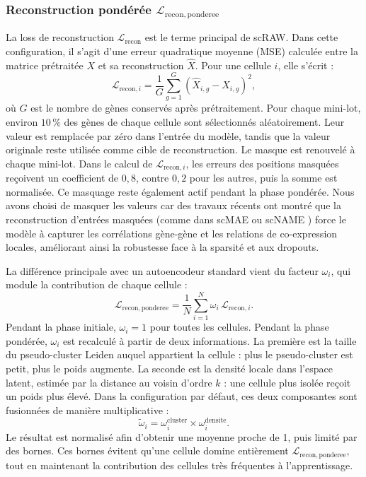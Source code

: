 \subsubsection*{\texorpdfstring{Reconstruction pondérée \(\mathcal{L}_{\mathrm{recon,ponderee}}\)}{Reconstruction pondérée L recon ponderee}}

La loss de reconstruction \(\mathcal{L}_{\mathrm{recon}}\) est le terme principal de scRAW. Dans cette configuration, il s'agit d'une erreur quadratique moyenne (MSE) calculée entre la matrice prétraitée \(X\) et sa reconstruction \(\hat{X}\). Pour une cellule \(i\), elle s'écrit :
\begin{equation}
  \mathcal{L}_{\mathrm{recon},i}
  =
  \frac{1}{G}\sum_{g=1}^{G}(\hat{X}_{i,g}-X_{i,g})^2,
  \label{eq:loss_recon_i}
\end{equation}
où \(G\) est le nombre de gènes conservés après prétraitement. Pour chaque mini-lot, environ \(10\,\%\) des gènes de chaque cellule sont sélectionnés aléatoirement. Leur valeur est remplacée par zéro dans l'entrée du modèle, tandis que la valeur originale reste utilisée comme cible de reconstruction. Le masque est renouvelé à chaque mini-lot. Dans le calcul de \(\mathcal{L}_{\mathrm{recon},i}\), les erreurs des positions masquées reçoivent un coefficient de \(0{,}8\), contre \(0{,}2\) pour les autres, puis la somme est normalisée. Ce masquage reste également actif pendant la phase pondérée. Nous avons choisi de masquer les valeurs car des travaux récents ont montré que la reconstruction d'entrées masquées (comme dans scMAE \cite{Fang2024scMAE} ou scNAME \cite{wan_scname_2022}) force le modèle à capturer les corrélations gène-gène et les relations de co-expression locales, améliorant ainsi la robustesse face à la sparsité et aux dropouts.

La différence principale avec un autoencodeur standard vient du facteur \(\omega_i\), qui module la contribution de chaque cellule :
\begin{equation}
  \mathcal{L}_{\mathrm{recon,ponderee}}
  =
  \frac{1}{N}\sum_{i=1}^{N}
  \omega_i\,\mathcal{L}_{\mathrm{recon},i}.
  \label{eq:loss_recon_ponderee}
\end{equation}
Pendant la phase initiale, \(\omega_i=1\) pour toutes les cellules. Pendant la phase pondérée, \(\omega_i\) est recalculé à partir de deux informations. La première est la taille du pseudo-cluster Leiden auquel appartient la cellule : plus le pseudo-cluster est petit, plus le poids augmente. La seconde est la densité locale dans l'espace latent, estimée par la distance au voisin d'ordre $k$ : une cellule plus isolée reçoit un poids plus élevé. Dans la configuration par défaut, ces deux composantes sont fusionnées de manière multiplicative :
\begin{equation}
  \tilde{\omega}_i
  =
  \omega^{\mathrm{cluster}}_i
  \times
  \omega^{\mathrm{densite}}_i.
  \label{eq:omega_tilde}
\end{equation}
Le résultat est normalisé afin d'obtenir une moyenne proche de 1, puis limité par des bornes. Ces bornes évitent qu'une cellule domine entièrement \(\mathcal{L}_{\mathrm{recon,ponderee}}\), tout en maintenant la contribution des cellules très fréquentes à l'apprentissage.

